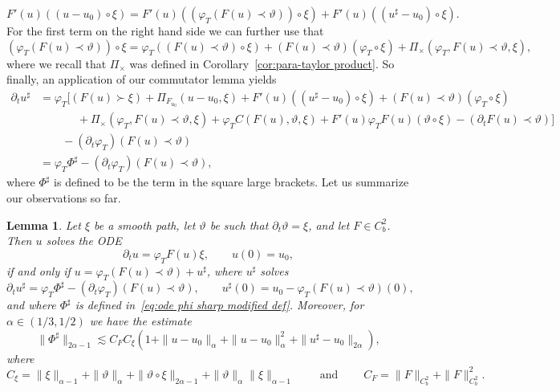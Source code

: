 \documentclass[11pt,a4paper]{article}
\newcommand{\tmop}[1]{\ensuremath{\operatorname{#1}}}
\newtheorem{lemma}[theorem]{Lemma}
\theoremstyle{remark}
\begin{document}
\[
   F' ( u )  ( ( u-u_{0} ) \circ \xi ) =F' ( u ) ( ( \varphi_{T} ( F ( u ) \prec \vartheta ) ) \circ \xi )  +F' ( u ) ( ( u^{\sharp} -u_{0} ) \circ \xi ).
\]
For the first term on the right hand side we can further use that
\[
   ( \varphi_{T} ( F ( u ) \prec \vartheta ) ) \circ \xi = \varphi_{T} ( ( F (u ) \prec \vartheta ) \circ \xi ) + ( F ( u ) \prec \vartheta ) (\varphi_{T} \circ \xi ) + \Pi_{\times} ( \varphi_{T} ,F ( u ) \prec   \vartheta , \xi ),
\]
where we recall that $\Pi_\times$ was defined in Corollary~\ref{cor:para-taylor product}. So finally, an application of our commutator lemma yields
\begin{align}\label{eq:ode phi sharp modified def} \nonumber
   \partial_{t} u^{\sharp} & = \varphi_{T} \bigg[ ( F ( u ) \succ \xi ) + \Pi_{F_{u_{0}}} ( u-u_{0} , \xi ) +F' ( u ) ( ( u^{\sharp} -u_{0} ) \circ \xi ) + ( F ( u ) \prec \vartheta ) ( \varphi_{T} \circ \xi ) \\ \nonumber
   &\hspace{40pt} + \Pi_{\times} ( \varphi_{T} ,F ( u ) \prec \vartheta , \xi ) + \varphi_{T} C ( F ( u ) , \vartheta , \xi ) +F' ( u ) \varphi_{T} F ( u ) ( \vartheta \circ \xi ) - ( \partial_{t} F ( u ) \prec \vartheta ) \bigg] \\ \nonumber
   &\qquad - ( \partial_{t} \varphi_{T} )  ( F ( u ) \prec \vartheta ) \\
   & = \varphi_{T} \Phi^{\sharp} - (\partial_{t} \varphi_{T} )  ( F ( u ) \prec \vartheta ),
\end{align}
where $\Phi^\sharp$ is defined to be the term in the square large brackets. Let us summarize our observations so far.

\begin{lemma}
  Let $\xi$ be a smooth path, let $\vartheta$ be such that $\partial_{t}  \vartheta = \xi$, and let $F \in C^{2}_{b}$. Then
  $u$ solves the ODE
  \[
     \partial_{t} u= \varphi_{T} F ( u ) \xi, \qquad u ( 0 ) =u_{0},
  \]
  if and only if $u= \varphi_{T} ( F (u ) \prec \vartheta ) +u^{\sharp}$, where $u^{\sharp}$ solves
  \[
     \partial_{t} u^{\sharp} = \varphi_{T} \Phi^{\sharp} - ( \partial_{t} \varphi_{T} )  ( F ( u ) \prec \vartheta ), \qquad u^{\sharp} ( 0 ) =u_{0} - \varphi_{T} ( F ( u )\prec \vartheta ) ( 0 ),
  \]
  and where $\Phi^{\sharp}$ is defined in~\eqref{eq:ode phi sharp modified def}. Moreover, for $\alpha \in ( 1/3,1/2 )$ we have the estimate
  \[
     \| \Phi^{\sharp} \|_{2 \alpha -1} \lesssim C_{F} C_{\xi} ( 1+ \| u-u_{0}  \|_{\alpha} + \| u-u_{0} \|^{2}_{\alpha} + \| u^{\sharp} -u_{0} \|_{2 \alpha} ),
  \]
  where
  \[
     C_{\xi} = \| \xi \|_{\alpha -1} + \| \vartheta \|_{\alpha} + \| \vartheta \circ   \xi \|_{2 \alpha -1} + \| \vartheta \|_{\alpha} \| \xi \|_{\alpha -1} \qquad \tmop{and} \qquad C_{F} = \| F \|_{C^{2}_{b}} + \| F \|_{C^{2}_{b}}^{2} .
  \]   
\end{lemma}
\end{document}
